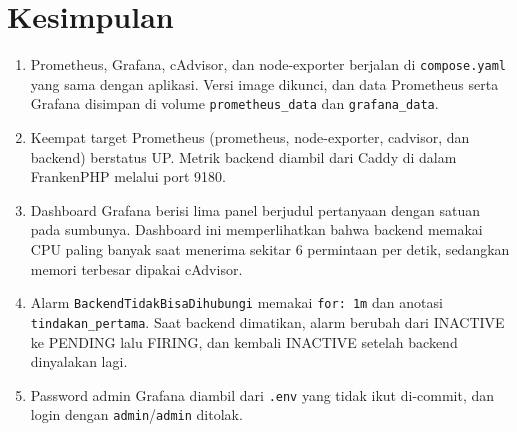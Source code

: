 \documentclass[a4paper,oneside,12pt]{report}
\begin{document}
\chapter{Kesimpulan}
\begin{enumerate}
    \item Prometheus, Grafana, cAdvisor, dan node-exporter berjalan di \texttt{compose.yaml} yang sama dengan aplikasi. Versi image dikunci, dan data Prometheus serta Grafana disimpan di volume \texttt{prometheus\_data} dan \texttt{grafana\_data}.
    \item Keempat target Prometheus (prometheus, node-exporter, cadvisor, dan backend) berstatus UP. Metrik backend diambil dari Caddy di dalam FrankenPHP melalui port 9180.
    \item Dashboard Grafana berisi lima panel berjudul pertanyaan dengan satuan pada sumbunya. Dashboard ini memperlihatkan bahwa backend memakai CPU paling banyak saat menerima sekitar 6 permintaan per detik, sedangkan memori terbesar dipakai cAdvisor.
    \item Alarm \texttt{BackendTidakBisaDihubungi} memakai \texttt{for: 1m} dan anotasi \texttt{tindakan\_pertama}. Saat backend dimatikan, alarm berubah dari INACTIVE ke PENDING lalu FIRING, dan kembali INACTIVE setelah backend dinyalakan lagi.
    \item Password admin Grafana diambil dari \texttt{.env} yang tidak ikut di-commit, dan login dengan \texttt{admin}/\texttt{admin} ditolak.
\end{enumerate}

\clearpage
\end{document}
